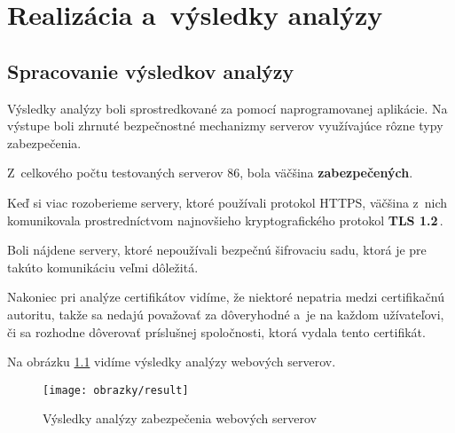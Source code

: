 \chapter[Realizácia a~výsledky analýzy]{Realizácia a~výsledky analýzy}
\section{Spracovanie výsledkov analýzy}
Výsledky analýzy boli sprostredkované za pomocí naprogramovanej aplikácie. Na výstupe boli zhrnuté bezpečnostné mechanizmy serverov využívajúce rôzne typy zabezpečenia. 

Z~celkového počtu testovaných serverov 86, bola väčšina \textbf{zabezpečených}.

Keď si viac rozoberieme servery, ktoré používali protokol HTTPS, väčšina z~nich komunikovala prostredníctvom najnovšieho kryptografického protokol \textbf{TLS 1.2}\,.

Boli nájdene servery, ktoré nepoužívali bezpečnú šifrovaciu sadu, ktorá je pre takúto komunikáciu veľmi dôležitá.

Nakoniec pri analýze certifikátov vidíme, že niektoré nepatria medzi certifikačnú autoritu, takže sa nedajú považovať za dôveryhodné a~je na každom užívateľovi, či sa rozhodne dôverovať príslušnej spoločnosti, ktorá vydala tento certifikát.

Na obrázku \ref{result} vidíme výsledky analýzy webových serverov.

\begin{figure}[!h]
    \centering
    \vspace{0.3cm}
    \texttt{[image: obrazky/result]}
    \caption{Výsledky analýzy zabezpečenia webových serverov}
    \label{result}
\end{figure}
